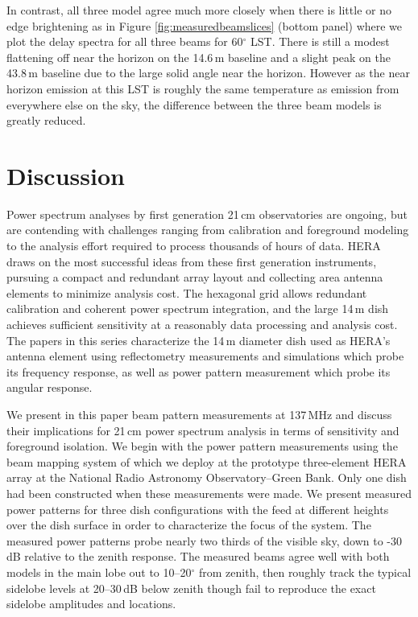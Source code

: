 \documentclass{emulateapj}
\begin{document}
In contrast, all three model agree much more closely when there is little or no edge brightening as in Figure \ref{fig:measuredbeamslices} (bottom panel) where we plot the delay spectra for all three beams for 60$^\circ$ LST. There is still a modest flattening off near the horizon on the 14.6\,m baseline and a slight peak on the 43.8\,m baseline due to the large solid angle near the horizon. However as the near horizon emission at this LST is roughly the same temperature as emission from everywhere else on the sky, the difference between the three beam models is greatly reduced.

\section{Discussion}


Power spectrum analyses by first generation 21\,cm observatories are ongoing, but are contending with challenges ranging from calibration and foreground modeling to the analysis effort required to process thousands of hours of data. HERA draws on the most successful ideas from these first generation instruments, pursuing a compact and redundant array layout and collecting area antenna elements to minimize analysis cost. The hexagonal grid allows redundant calibration and coherent power spectrum integration, and the large 14\,m dish achieves sufficient sensitivity at a reasonably data processing and analysis cost. The papers in this series characterize the 14\,m diameter dish used as HERA's antenna element using reflectometry measurements and simulations which probe its frequency response, as well as power pattern measurement which probe its angular response. 


We present in this paper beam pattern measurements at 137\,MHz and discuss their implications for 21\,cm power spectrum analysis in terms of sensitivity and foreground isolation. We begin with the power pattern measurements using the beam mapping system of \citet{neben15} which we deploy at the prototype three-element HERA array at the National Radio Astronomy Observatory--Green Bank. Only one dish had been constructed when these measurements were made. We present measured power patterns for three dish configurations with the feed at different heights over the dish surface in order to characterize the focus of the system. The measured power patterns probe nearly two thirds of the visible sky, down to -30\,dB relative to the zenith response. The measured beams agree well with both models in the main lobe out to 10--20$^\circ$ from zenith, then roughly track the typical sidelobe levels at 20--30\,dB below zenith though fail to reproduce the exact sidelobe amplitudes and locations. 
\end{document}
